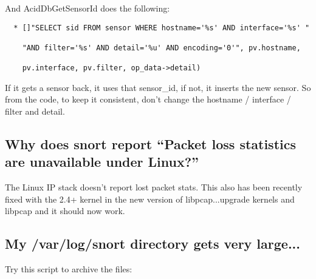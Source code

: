 \documentclass{article}
\begin{document}
And AcidDbGetSensorId does the following:
\begin{verbatim}
  * []"SELECT sid FROM sensor WHERE hostname='%s' AND interface='%s' " 

    "AND filter='%s' AND detail='%u' AND encoding='0'", pv.hostname, 

    pv.interface, pv.filter, op_data->detail)
\end{verbatim}

If it gets a sensor back, it uses that sensor\_id, if not, it inserts the new
sensor. So from the code, to keep it consistent, don't change the hostname /
interface / filter and detail.

\subsection{Why does snort report ``Packet loss statistics are unavailable under Linux?''}

The Linux IP stack doesn't report lost packet stats. This also has been
recently fixed with the 2.4+ kernel in the new version of libpcap...upgrade
kernels and libpcap and it should now work.

\subsection{My /var/log/snort directory gets very large...}

Try this script to archive the files:
\end{document}
